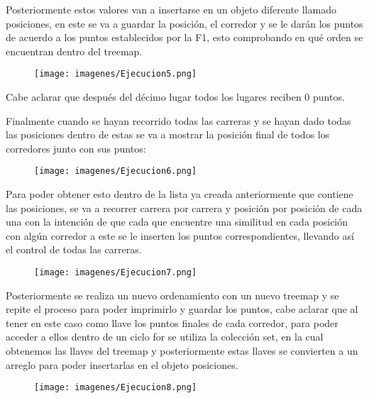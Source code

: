 \documentclass[12pt, letterpaper]{article} %
\begin{document}
\begin{itemize}
    Posteriormente estos valores van a insertarse en un objeto diferente llamado posiciones, en este se va a guardar la posición, el corredor y se le darán los puntos de acuerdo a los puntos establecidos por la F1, esto comprobando en qué orden se encuentran dentro del treemap.
    \begin{figure}[h]
        \centering
        \texttt{[image: imagenes/Ejecucion5.png]}
        \label{fig:e5}
    \end{figure}
    
    Cabe aclarar que después del décimo lugar todos los lugares reciben 0 puntos.
    \vspace{5mm}
    
    Finalmente cuando se hayan recorrido todas las carreras y se hayan dado todas las posiciones dentro de estas se va a mostrar la posición final de todos los corredores junto con sus puntos:
    
    \begin{figure}[h]
        \centering
        \texttt{[image: imagenes/Ejecucion6.png]}
        \label{fig:e6}
    \end{figure}

    Para poder obtener esto dentro de la lista ya creada anteriormente que contiene las posiciones, se va a recorrer carrera por carrera y posición por posición de cada una con la intención de que cada que encuentre una similitud en cada posición con algún corredor a este se le inserten los puntos correspondientes, llevando así el control de todas las carreras.
    
    \begin{figure}[h]
        \centering
        \texttt{[image: imagenes/Ejecucion7.png]}
        \label{fig:e7}
    \end{figure}

    Posteriormente se realiza un nuevo ordenamiento con un nuevo treemap y se repite el proceso para poder imprimirlo y guardar los puntos, cabe aclarar que al tener en este caso como llave los puntos finales de cada corredor, para poder acceder a ellos dentro de un ciclo for se utiliza la colección set, en la cual obtenemos las llaves del treemap y posteriormente estas llaves se convierten a un arreglo para poder insertarlas en el objeto posiciones.
    
    \begin{figure}[h]
        \centering
        \texttt{[image: imagenes/Ejecucion8.png]}
        \label{fig:e8}
    \end{figure}


\end{itemize}
\end{document}
